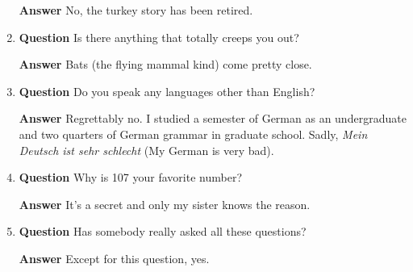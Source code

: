 \documentclass[12pt]{article}
\newcounter{ex}\setcounter{ex}{0}
\newcounter{dy}\setcounter{dy}{0}
\begin{document}
\begin{enumerate}
 \textbf{Answer} No, the turkey story has been retired.


\item   \textbf{Question} Is there anything that totally creeps you out?

\textbf{Answer} Bats (the flying mammal kind) come pretty close.

\item \textbf{Question} Do you speak any languages other than English?

\textbf{Answer} Regrettably no. I studied a semester of German as an 
undergraduate and two quarters of German grammar in graduate school. 
Sadly, \emph{Mein Deutsch ist sehr schlecht} (My German is very bad).

\item \textbf{Question} Why is 107 your favorite number?

\textbf{Answer} It's a secret and only my sister knows the reason.

\item \textbf{Question} Has somebody really asked all these questions?

\textbf{Answer}  Except for  this question, yes.
\end{enumerate}
\end{document}

